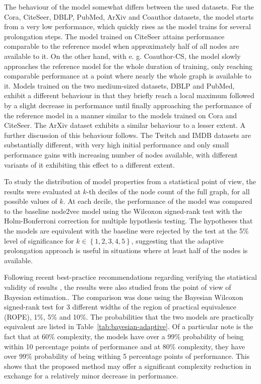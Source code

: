 The behaviour of the model somewhat differs between the used datasets. For the Cora, CiteSeer, DBLP, PubMed, ArXiv and Coauthor datasets, the model starts from a very low performance, which quickly rises as the model trains for several prolongation steps. The model trained on CiteSeer attains performance comparable to the reference model when approximately half of all nodes are available to it. On the other hand, with e. g. Coauthor-CS, the model slowly approaches the reference model for the whole duration of training, only reaching comparable performance at a point where nearly the whole graph is available to it. Models trained on the two medium-sized datasets, DBLP and PubMed, exhibit a different behaviour in that they briefly reach a local maximum followed by a slight decrease in performance until finally approaching the performance of the reference model in a manner similar to the models trained on Cora and CiteSeer. The ArXiv dataset exhibits a similar behaviour to a lesser extent. A further discussion of this behaviour follows. The Twitch and IMDB datasets are substantially different, with very high initial performance and only small performance gains with increasing number of nodes available, with different variants of it exhibiting this effect to a different extent.

To study the distribution of model properties from a statistical point of view, the results were evaluated at \( k \)-th deciles of the node count of the full graph, for all possible values of \( k \). At each decile, the performance of the model was compared to the baseline node2vec model using the Wilcoxon signed-rank test with the Holm-Bonferroni correction for multiple hypothesis testing. The hypotheses that the models are equivalent with the baseline were rejected by the test at the 5\% level of significance for \( k \in \left\{ 1, 2, 3, 4, 5 \right\} \), suggesting that the adaptive prolongation approach is useful in situations where at least half of the nodes is available.

Following recent best-practice recommendations regarding verifying the statistical validity of results \cite{benavoli_time_2017}, the results were also studied from the point of view of Bayesian estimation.. The comparison was done using the Bayesian Wilcoxon signed-rank test \cite{benavoli_bayesian_2014} for 3 different widths of the region of practical equivalence (ROPE), 1\%, 5\% and 10\%. The probabilities that the two models are practically equivalent are listed in Table~\ref{tab:bayesian-adaptive}. Of a particular note is the fact that  at 60\% complexity, the models have over a 99\% probability of being within 10 percentage points of performance and at 80\% complexity, they have over 99\% probability of being withing 5 percentage points of performance. This shows that the proposed method may offer a significant complexity reduction in exchange for a relatively minor decrease in performance.

